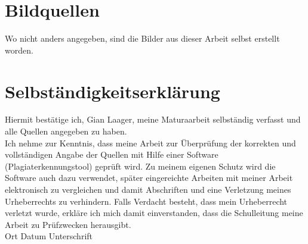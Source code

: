 \documentclass[11pt,DIV=10,final]{scrreprt} %
\begin{document}
\chapter*{Bildquellen}
%
Wo nicht anders angegeben, sind die Bilder aus dieser Arbeit selbst erstellt worden.
%



%
\chapter*{Selbständigkeitserklärung}
%
Hiermit bestätige ich, Gian Laager, meine Maturaarbeit selbständig verfasst und alle Quellen angegeben zu haben.\\\newline
Ich nehme zur Kenntnis, dass meine Arbeit zur Überprüfung der korrekten und vollständigen Angabe der Quellen mit Hilfe einer Software (Plagiaterkennungstool) geprüft wird. Zu meinem eigenen Schutz wird die Software auch dazu verwendet, später eingereichte Arbeiten mit meiner Arbeit elektronisch zu vergleichen und damit Abschriften und eine Verletzung meines Urheberrechts zu verhindern. Falls Verdacht besteht, dass mein Urheberrecht verletzt wurde, erkläre ich mich damit einverstanden, dass die Schulleitung meine Arbeit zu Prüfzwecken herausgibt.\\\newline
Ort\hspace{4cm} Datum\hspace{4cm}  Unterschrift
%
\end{document}
